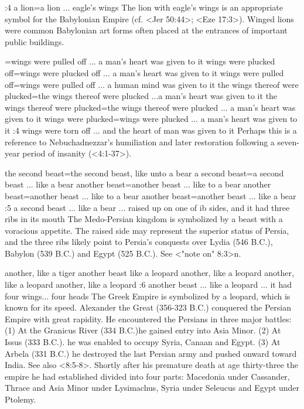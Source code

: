 :4 {a lion}={a lion ... eagle's wings} The lion with eagle's wings is an
appropriate symbol for the Babylonian Empire (cf. <Jer 50:44>; <Eze 17:3>). Winged lions were common
Babylonian art forms often placed at the entrances of important public buildings.

={wings were pulled off ... a man's heart was given to it} %
    {wings were plucked off}={wings were plucked off ... a man’s heart was given to it} %
    {wings were pulled off}={wings were pulled off ... a human mind was given to it} %
    {the wings thereof were plucked}={the wings thereof were plucked ...a man's heart was given to it} %
    {the wings thereof were plucked}={the wings thereof were plucked ... a man's heart was given to it} %
    {wings were plucked}={wings were plucked ... a man's heart was given to it} %
:4 {wings were torn off ... and the heart of man was given to it}
Perhaps this is a reference to Nebuchadnezzar's
humiliation and later restoration following a seven-year period of insanity (<4:1-37>).

    {the second beast}={the second beast, like unto a bear} %
    {a second beast}={a second beast ... like a bear} %
    {another beast}={another beast ... like to a bear} %
    {another beast}={another beast ... like to a bear} %
    {another beast}={another beast ... like a bear} %
:5 {a second beast ... like a bear ... raised up on one of ib sides, and it had three ribs in
its mouth}
The Medo-Persian kingdom is symbolized by a beast with a voracious appetite. The raised side may
represent the superior status of Persia, and the three ribs likely point to Persia's conquests over
Lydia (546 B.C.), Babylon (539 B.C.) and Egypt (525 B.C.). See <"note on" 8:3>n.

    {another, like a tiger} %
    {another beast like a leopard} %
    {another, like a leopard} %
    {another, like a leopard} %
    {another, like a leopard} %
:6 {another beast ... like a leopard ... it had four wings... four heads}
The Greek Empire is symbolized by a leopard,
which is known for its speed. Alexander the Great (356-323 B.C.) conquered the Persian Empire with
great rapidity. He encountered the Persians in three major battles: (1) At the Granicus River (334
B.C.)he gained entry into Asia Minor. (2) At Issus (333 B.C.). he was enabled to occupy Syria,
Canaan and Egypt. (3) At Arbela (331 B.C.) he destroyed the last Persian army and pushed onward
toward India. See also <8:5-8>. Shortly after his premature death at age thirty-three the empire he had
established divided into four parts: Macedonia under Cassander, Thrace and Asia Minor under
Lysimachus, Syria under Seleucus and Egypt under Ptolemy.  


